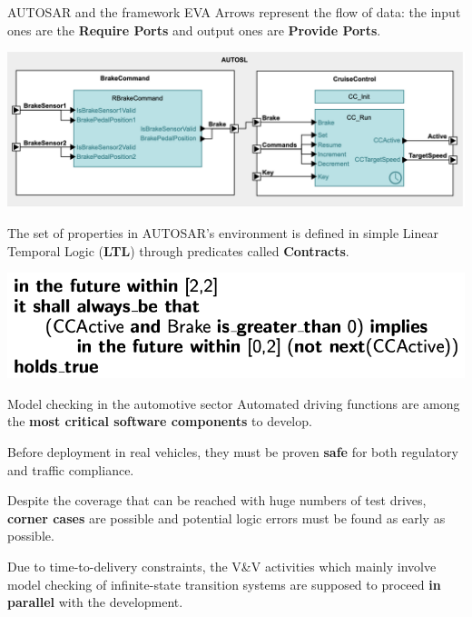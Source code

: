 \documentclass[aspectratio=1610,10.5pt]{beamer} %
\begin{document}
\begin{frame}{AUTOSAR and the framework EVA}
    Arrows represent the flow of data: the input ones are the \textbf{Require Ports} and output ones are \textbf{Provide Ports}.

    \begin{center}
        \includegraphics[height=%
        0.40\textheight]{../res/AUTOSARModel}
    \end{center}

    The set of properties in AUTOSAR's environment is defined in simple Linear Temporal Logic (\textbf{LTL}) through predicates called \textbf{Contracts}.

    \begin{center}
        \includegraphics[height=%
        0.25\textheight]{../res/AUTOSARLogic}
    \end{center}
\end{frame}

\begin{frame}{Model checking in the automotive sector}
    Automated driving functions are among the \textbf{most critical software components} to develop.

    \smallskip

    Before deployment in real vehicles, they must be proven \textbf{safe} for both regulatory and traffic compliance.

    \bigskip

    Despite the coverage that can be reached with huge numbers of test drives, \textbf{corner cases} are possible and potential logic errors must be found as early as possible.

    \bigskip

    Due to time-to-delivery constraints, the V\&V activities which mainly involve model checking of infinite-state transition systems are supposed to proceed \textbf{in parallel} with the development.
\end{frame}
\end{document}
